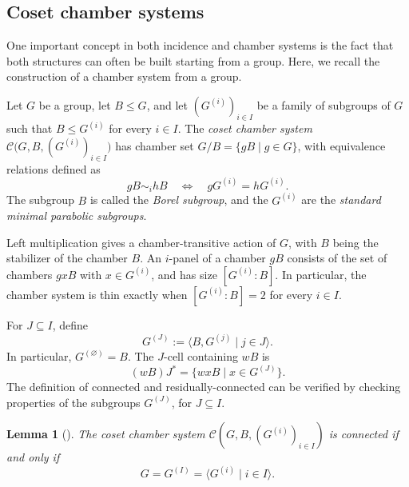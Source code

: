 \documentclass[10pt,a4paper]{amsart}
\newtheorem{lemma}[prop]{Lemma}
\newcommand{\CC}{\mathcal{C}}
\begin{document}
\subsection{Coset chamber systems}\label{sec:CosetChamberSystem}

One important concept in both incidence and chamber systems is the fact that both structures can often be built starting from a group. Here, we recall the construction of a chamber system from a group.

Let $G$ be a group, let $B\leq G$, and let $(G^{(i)})_{i\in I}$ be a family
of subgroups of $G$ such that $B\leq G^{(i)}$ for every $i\in I$.  The
\emph{coset chamber system}
    $\CC\bigl(G,B,(G^{(i)})_{i\in I}\bigr)$
has chamber set $G/B=\{gB\mid g\in G\}$, with equivalence relations defined as
\[
    gB\sim_i hB
    \quad\Longleftrightarrow\quad
    gG^{(i)}=hG^{(i)}.
\]
The subgroup $B$ is called the \emph{Borel subgroup}, and the $G^{(i)}$ are the
\emph{standard minimal parabolic subgroups}.

Left multiplication gives a chamber-transitive action of $G$, with
$B$ being the stabilizer of the chamber $B$.  An $i$-panel of a chamber $gB$ consists of the set of chambers
$gxB$ with $x\in G^{(i)}$, and has size $[G^{(i)}:B]$.  In particular, the
chamber system is thin exactly when $[G^{(i)}:B]=2$ for every $i\in I$.

For $J\subseteq I$, define
    \[G^{(J)}:=\bigl\langle B,G^{(j)}\mid j\in J\bigr\rangle.\]
In particular, $G^{(\varnothing)}=B$.  The $J$-cell containing $wB$ is
\begin{equation}
\label{eq:J-cell-coset-system}
    (wB)J^*=\{wxB\mid x\in G^{(J)}\}.
\end{equation}
The definition of connected and residually-connected can be verified by checking properties of the subgroups $G^{(J)}$, for $J\subseteq I$.

\begin{lemma}[{\cite[Lemma~3.6.7]{buekenhout2013diagram}}]
\label{lem:connected-coset-system}
The coset chamber system $\CC(G,B,(G^{(i)})_{i\in I})$ is connected if and only if
\[
    G=G^{(I)}=\langle G^{(i)}\mid i\in I\rangle.
\]
\end{lemma}
\end{document}
